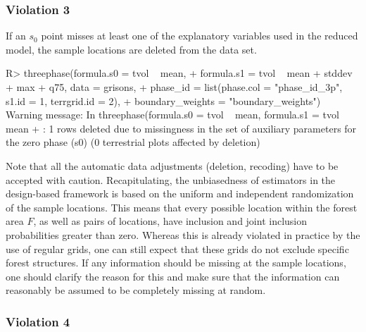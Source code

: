 \subsubsection*{Violation 3}

If an $s_0$ point misses at least one of the explanatory variables used in the reduced model, the sample locations are deleted from the data set.

\begin{small}
\begin{Schunk}
\end{Schunk}
\end{small}

\begin{small}
\begin{Schunk}
\begin{Sinput}
R> threephase(formula.s0 = tvol ~ mean, 
+    formula.s1 = tvol ~  mean + stddev + max + q75,  data = grisons,
+    phase_id = list(phase.col = "phase_id_3p", s1.id = 1, terrgrid.id = 2),
+    boundary_weights = "boundary_weights")
Warning message:
In threephase(formula.s0 = tvol ~ mean, formula.s1 = tvol ~ mean +  :
  1 rows deleted due to missingness in the set of auxiliary parameters for the 
  zero phase (s0) (0 terrestrial plots affected by deletion)
\end{Sinput}
\end{Schunk}
\end{small}

Note that all the automatic data adjustments (deletion, recoding) have to be accepted with caution. Recapitulating, the unbiasedness of estimators in the design-based framework is based on the uniform and independent randomization of the sample locations. This means that every possible location within the forest area $F$, as well as pairs of locations, have inclusion and joint inclusion probabilities greater than zero. Whereas this is already violated in practice by the use of regular grids, one can still expect that these grids do not exclude specific forest structures. If any information should be missing at the sample locations, one should clarify the reason for this and make sure that the information can reasonably be assumed to be completely missing at random.


\subsubsection*{Violation 4}

